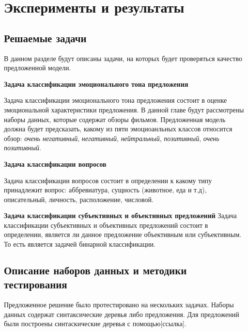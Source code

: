 
\chapter{Эксперименты и результаты}

\section{Решаемые задачи}
В данном разделе будут описаны задачи, на которых будет проверяться качество предложенной модели.
\vspace{5mm}

\noindent \textbf{Задача классификации эмоционального тона предложения}\par
Задача классификации эмоционального тона предложения состоит в оценке эмоциональной характеристики предложения. В данной главе будут рассмотрены наборы данных, которые содержат обзоры фильмов. 
Предложенная модель должна будет предсказать, какому из пяти эмоциоанльных классов относится обзор:
\emph{очень негативный}, \emph{негативный}, \emph{нейтральный}, \emph{позитивный}, \emph{очень позитивный}.
\vspace{5mm}

\noindent \textbf{Задача классификации вопросов}\par
Задача классификации вопросов состоит в определении к какому типу принадлежит вопрос:
аббревиатура, сущность (животное, еда и т.д), описательный, личность, расположение, числовой.

\noindent \textbf{Задача классификации субъективных и объективных предложений}
Задача классификации субъективных и объективных предложений состоит в определении, является ли данное предложение объективным или субъективным. То есть является задачей бинарной классификации.

\section{Описание наборов данных и методики тестирования}
Предложенное решение было протестировано на нескольких задачах. 
Наборы данных содержат синтаксические деревья либо предложения. 
Для предложений были построены синтаскические деревья с помощью[ссылка].
\vspace{5mm}


